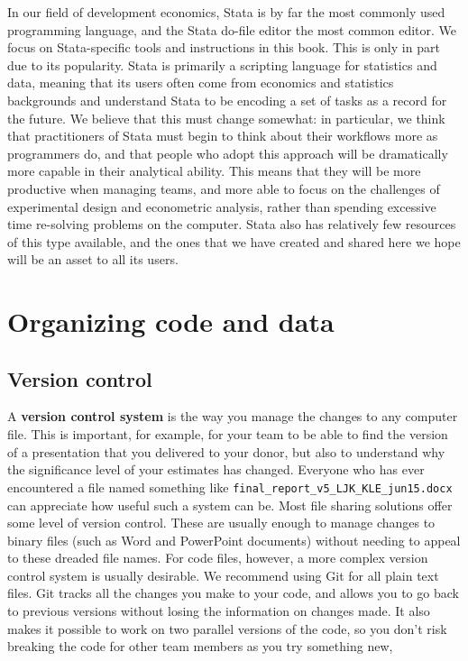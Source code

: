 In our field of development economics,
Stata is by far the most commonly used programming language,
and the Stata do-file editor the most common editor.
We focus on Stata-specific tools and instructions in this book.
This is only in part due to its popularity.
Stata is primarily a scripting language for statistics and data,
meaning that its users often come from economics and statistics backgrounds
and understand Stata to be encoding a set of tasks as a record for the future.
We believe that this must change somewhat:
in particular, we think that practitioners of Stata
must begin to think about their workflows more as programmers do,
and that people who adopt this approach will be dramatically
more capable in their analytical ability.
This means that they will be more productive when managing teams,
and more able to focus on the challenges of experimental design
and econometric analysis, rather than spending excessive time
re-solving problems on the computer.
Stata also has relatively few resources of this type available,
and the ones that we have created and shared here
we hope will be an asset to all its users.

\section{Organizing code and data}

\subsection{Version control}

A \textbf{version control system} is the way you manage the changes to any computer file.
This is important, for example, for your team to be able to find the version of a presentation that you delivered to your donor,
but also to understand why the significance level of your estimates has changed.
Everyone who has ever encountered a file named something like \texttt{final\_report\_v5\_LJK\_KLE\_jun15.docx}
can appreciate how useful such a system can be.
Most file sharing solutions offer some level of version control.
These are usually enough to manage changes to binary files (such as Word and PowerPoint documents) without needing to appeal to these dreaded file names.
For code files, however, a more complex version control system is usually desirable.
We recommend using Git for all plain text files.
Git tracks all the changes you make to your code,
and allows you to go back to previous versions without losing the information on changes made.
It also makes it possible to work on two parallel versions of the code,
so you don't risk breaking the code for other team members as you try something new,

